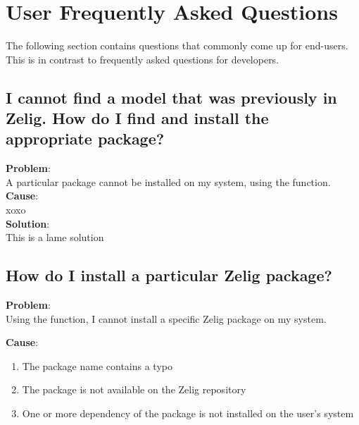 %
%
%

\newcommand{\problem}[1] {
  {\noindent\bf Problem}: \\
  #1
}

\newcommand{\cause}[1] {
  {\noindent\bf Cause}: \\
  #1
}

\newcommand{\solution}[1] {
  {\noindent\bf Solution}: \\
  #1
}


%
%
\section{User Frequently Asked Questions}
\label{sec:user-faq}

The following section contains questions that commonly come up for end-users.
This is in contrast to frequently asked questions for developers.

\subsection{I cannot find a model that was previously in Zelig. How do I find
  and install the appropriate package?
}

\label{subsec:install-specific-package}

\problem{
  A particular package cannot be installed on my system, using the
  \code{install.packages} function.
  \\
}


\cause{
  xoxo
  \\
}

\solution{
  This is a lame solution
}


\subsection{How do I install a particular Zelig package?}

\problem{Using the  function, I cannot install a specific Zelig package on my system.}

\cause{
  \begin{enumerate}
    \item The package name contains a typo
    \item The package is not available on the Zelig repository
    \item One or more dependency of the package is not installed on the user's system
  \end{enumerate}
}

